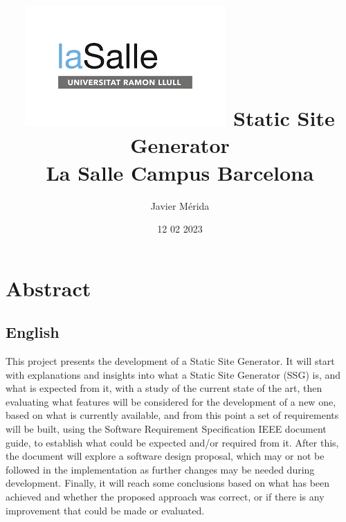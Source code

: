 \documentclass[12pt]{report}
\title{
    \vspace*{1cm}
    {\includegraphics{lasalle-logo}}
    {Static Site Generator}\\
    {\large La Salle Campus Barcelona}\\
}
\author{Javier Mérida}
\date{12 02 2023}
\begin{document}
%
%
%
%
%
%
%
%
%
%
%

    \chapter*{Abstract}\label{ch:ch:chapter}
    \section*{English}\label{sec:english}
    This project presents the development of a Static Site Generator. It will start with explanations and insights
    into what a Static Site Generator (SSG) is, and what is expected from it, with a study of the current state of
    the art, then evaluating what features will be considered for the development of a new one, based on what is
    currently available, and from this point a set of requirements will be built, using the Software Requirement
    Specification IEEE document guide, to establish what could be expected and/or required from it. After this, the
    document will explore a software design proposal, which may or not be followed in the implementation as further
    changes may be needed during development. Finally, it will reach some conclusions based on what has been achieved
    and whether the proposed approach was correct, or if there is any improvement that could be made or evaluated.
\end{document}
